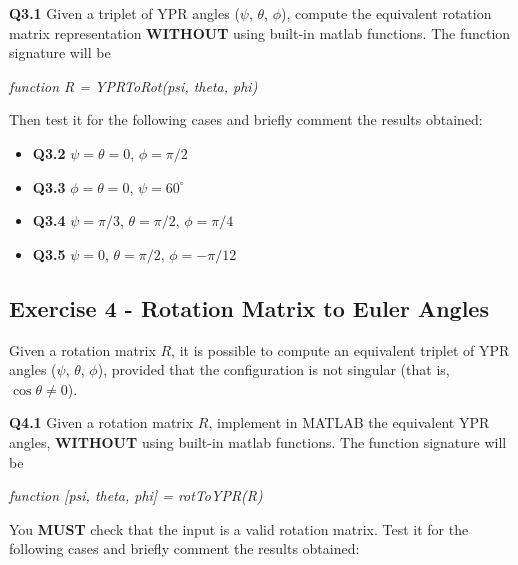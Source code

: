 \textbf{Q3.1} Given a triplet of YPR angles ($\psi$, $\theta$, $\phi$), compute the equivalent rotation matrix representation \textbf{WITHOUT} using built-in matlab functions. The function signature will be


\begin{center}\textit{function R = YPRToRot(psi, theta, phi)}\end{center}


Then test it for the following cases and briefly comment the results obtained:


\begin{itemize}
    \item \textbf{Q3.2}\hspace{10mm} $\psi=\theta=0$, $\phi=\pi/2$
    \item \textbf{Q3.3}\hspace{10mm} $\phi=\theta=0$, $\psi=60^\circ$
    \item \textbf{Q3.4}\hspace{10mm} $\psi=\pi/3$, $\theta=\pi/2$, $\phi=\pi/4$
    \item \textbf{Q3.5}\hspace{10mm} $\psi=0$, $\theta=\pi/2$, $\phi=-\pi/12$
\end{itemize}

\subsection{Exercise 4 - Rotation Matrix to Euler Angles}
Given a rotation matrix \begin{math}R\end{math}, it is possible to compute an equivalent triplet of YPR angles ($\psi$, $\theta$, $\phi$), provided that the configuration is not singular (that is, $\cos{\theta} \ne 0$).
\newline

\textbf{Q4.1} Given a rotation matrix \begin{math}R\end{math}, implement in MATLAB the equivalent YPR angles, \textbf{WITHOUT} using built-in matlab functions. The function signature will be


\begin{center}\textit{function [psi, theta, phi] = rotToYPR(R)}\end{center}


You \textbf{MUST} check that the input is a valid rotation matrix. Test it for the following cases and briefly comment the results obtained:


